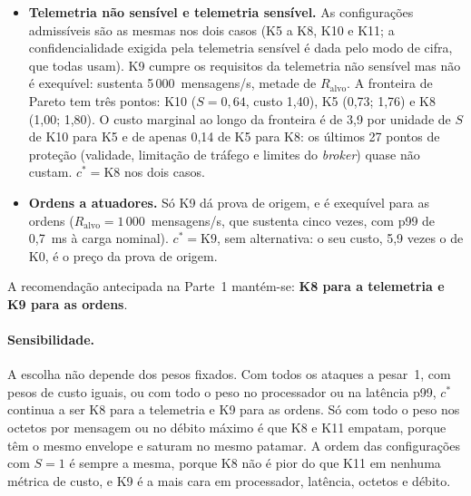 \begin{itemize}[leftmargin=*]
  \item \textbf{Telemetria não sensível e telemetria sensível.} As configurações
    admissíveis são as mesmas nos dois casos (K5 a K8, K10 e K11; a
    confidencialidade exigida pela telemetria sensível é dada pelo modo de cifra,
    que todas usam). K9 cumpre os requisitos da telemetria não sensível mas não é
    exequível: sustenta 5\,000~mensagens/s, metade de $R_{\text{alvo}}$. A
    fronteira de Pareto tem três pontos: K10 ($S = 0{,}64$, custo 1,40), K5
    (0,73; 1,76) e K8 (1,00; 1,80). O custo marginal ao longo da fronteira é de
    3,9 por unidade de $S$ de K10 para K5 e de apenas 0,14 de K5 para K8: os
    últimos 27 pontos de proteção (validade, 
    limitação de tráfego e limites do \emph{broker}) quase não custam. $c^* = \text{K8}$ nos dois casos.
  \item \textbf{Ordens a atuadores.} Só K9 dá prova de origem, e é exequível
    para as ordens ($R_{\text{alvo}} = 1\,000$~mensagens/s, que sustenta cinco
    vezes, com p99 de 0,7~ms à carga nominal). $c^* = \text{K9}$, sem
    alternativa: o seu custo, 5,9 vezes o de K0, é o preço da prova de origem.
\end{itemize}

A recomendação antecipada na Parte~1 mantém-se: \textbf{K8 para a telemetria e
K9 para as ordens}. 

\paragraph{Sensibilidade.} A escolha não depende dos pesos fixados. Com todos os
ataques a pesar~1, com pesos de custo iguais, ou com todo o peso no processador
ou na latência p99, $c^*$ continua a ser K8 para a telemetria e K9 para as
ordens. Só com todo o peso nos octetos por mensagem ou no débito máximo é que K8 e
K11 empatam, porque têm o mesmo envelope e saturam no mesmo patamar. A ordem das
configurações com $S = 1$ é sempre a mesma, porque K8 não é pior do que K11 em
nenhuma métrica de custo, e K9 é a mais cara em processador, latência, octetos e
débito.
